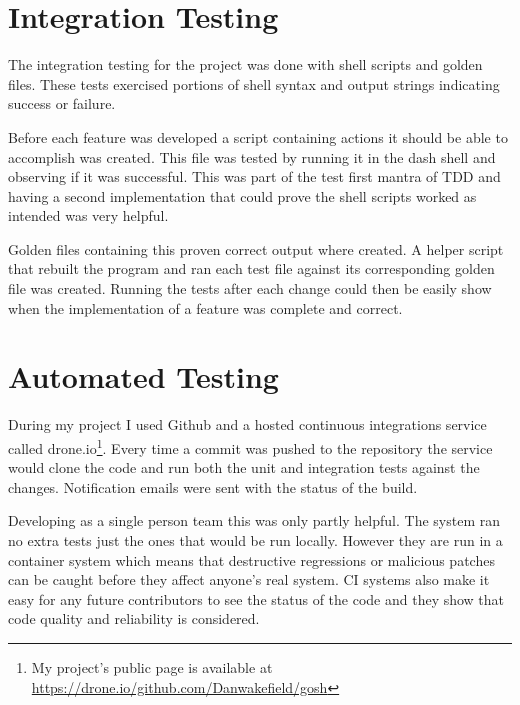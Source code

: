 \section{Integration Testing}
The integration testing for the project was done with shell scripts and golden files.
These tests exercised portions of shell syntax and output strings indicating success or failure.

Before each feature was developed a script containing actions it should be able to accomplish was created.
This file was tested by running it in the dash shell and observing if it was successful.
This was part of the test first mantra of TDD and having a second implementation that could prove the shell scripts worked as intended was very helpful.

Golden files containing this proven correct output where created.
A helper script that rebuilt the program and ran each test file against its corresponding golden file was created.
Running the tests after each change could then be easily show when the implementation of a feature was complete and correct.

\section{Automated Testing}
During my project I used Github and a hosted continuous integrations service called drone.io\footnote{My project's public page is available at \url{https://drone.io/github.com/Danwakefield/gosh}}.
Every time a commit was pushed to the repository the service would clone the code and run both the unit and integration tests against the changes.
Notification emails were sent with the status of the build.

Developing as a single person team this was only partly helpful.
The system ran no extra tests just the ones that would be run locally.
However they are run in a container system which means that destructive regressions or malicious patches can be caught before they affect anyone's real system. 
CI systems also make it easy for any future contributors to see the status of the code and they show that code quality and reliability is considered.














